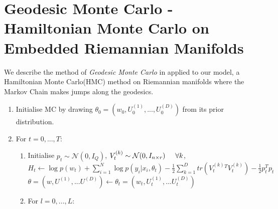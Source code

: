 \documentclass[a4paper,10pt]{article}
\newcommand{\forceindent}{\leavevmode{\parindent=2em\indent}}
\begin{document}
\begin{enumerate}
\begin{enumerate}
\begin{enumerate}
\end{enumerate}
\end{enumerate}

\end{enumerate}

\section{Geodesic Monte Carlo - Hamiltonian Monte Carlo on Embedded Riemannian Manifolds}

We describe the method of \textit{Geodesic Monte Carlo} in \cite{byrne2013geodesic} applied to our model, a Hamiltonian Monte Carlo(HMC) method on Riemannian manifolds where the Markov Chain makes jumps along the geodesics. 

\begin{enumerate}
\item Initialise MC by drawing $\theta_0=(w_0,U_0^{(1)},...,U_0^{(D)})$ from its prior distribution. 
\item For $t=0,...,T$:
\begin{enumerate}
\item Initialise $p_t \sim \mathcal{N}(0,I_Q)$, $V^{(k)}_t\sim \mathcal{N}(0,I_{n \times r}) \hspace{5mm} \forall k$, \\
\mbox{$H_t \leftarrow \log p(w_t)+\sum_{i=1}^N \log p(y_{i}|x_{i},\theta_t)-\frac{1}{2}\sum_{k=1}^D tr(V_t^{(k)}^T V_t^{(k)}) -\frac{1}{2}p_t^T p_t$} \\
$\theta=(w,U^{(1)},...U^{(D)}) \leftarrow \theta_t=(w_t,U_t^{(1)},...U_t^{(D)})$
\item For $l=0,...,L$:
\end{enumerate}
\end{enumerate}
\end{document}

